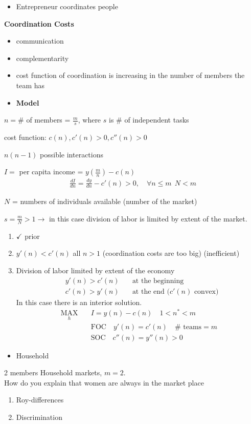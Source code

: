 \documentclass[14pt,notitlepage]{article}
\begin{document}
\begin{itemize}
\item Entrepreneur coordinates people
\end{itemize}

\textbf{Coordination Costs}
\begin{itemize}
\item communication
\item complementarity
\item cost function of coordination is increasing in the number of members the team has
\end{itemize}

\begin{itemize}
\item \textbf{Model}
\end{itemize}

$n = \#$ of members = $\frac{m}{s}$, where $s$ is $\#$ of independent tasks

cost function: \quad $c(n), c'(n) > 0, c''(n) > 0$

$n(n-1)$ possible interactions

$I = $ per capita income = $y(\frac{m}{n}) - c(n)$
\begin{align*}
\frac{dI}{dn} = \frac{dy}{dn} - c'(n) > 0, \quad \forall n \leq m\ \ N < m
\end{align*}

$N$ = numbers of individuals available (number of the market)

$s = \frac{m}{N} > 1 \rightarrow$ in this case division of labor is limited by extent of the market.

\begin{enumerate}[1.]
\item $\checkmark$ prior
\item $y'(n) < c'(n)$ all $n > 1$ (coordination costs are too big) (inefficient)
\item Division of labor limited by extent of the economy \\
\begin{align*}
&y'(n) > c'(n) \quad &\text{at the beginning} \\
&c'(n) > y'(n) \quad &\text{at the end ($c'(n)$ convex)}
\end{align*}
In this case there is an interior solution.
\begin{align*}
\underset{h}{\text{MAX}} \quad &I = y(n) - c(n) \quad 1 < n^* < m \\
&\text{FOC} \quad y'(n) = c'(n) \quad \text{$\#$ teams} = m \\
&\text{SOC} \quad c''(n) = y''(n) > 0
\end{align*}
\end{enumerate}

\begin{itemize}
\item Household
\end{itemize}

2 members
Household markets, $m = 2$. \\
How do you explain that women are always in the market place
\begin{enumerate}[1.]
\item Roy-differences
\item Discrimination
\end{enumerate}
\end{document}
